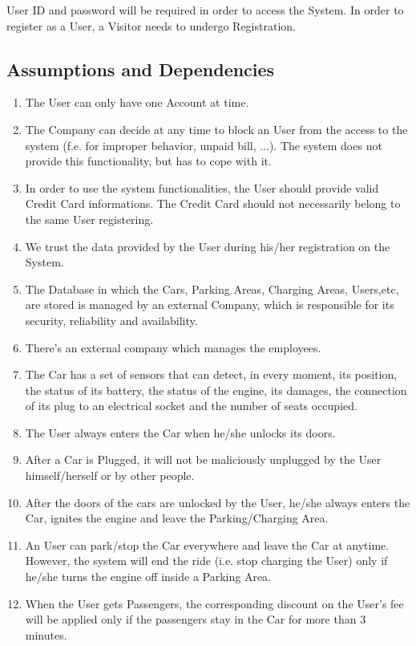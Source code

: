 User ID and password will be required in order to access the System. In order to register as a User, a Visitor needs to undergo Registration. 

\subsection{Assumptions and Dependencies}
\begin{enumerate}
	\item The User can only have one Account at time.
	\item The Company can decide at any time to block an User from the access to the system (f.e. for improper behavior, unpaid bill, ...). The system does not provide this functionality, but has to cope with it.
	\item In order to use the system functionalities, the User should provide valid Credit Card informations. The Credit Card should not necessarily belong to the same User registering.
	\item We trust the data provided by the User during his/her registration on the System.
	\item The Database in which the Cars, Parking Areas, Charging Areas, Users,etc, are stored is managed by an external Company, which is responsible for its security, reliability and availability.
	\item There's an external company which manages the employees.
	\item The Car has a set of sensors that can detect, in every moment, its position, the status of its battery, the status of the engine, its damages, the connection of its plug to an electrical socket and the number of seats occupied.
	\item The User always enters the Car when he/she unlocks its doors.	
	\item After a Car is Plugged, it will not be maliciously unplugged by the User himself/herself or by other people.
	\item After the doors of the cars are unlocked by the User, he/she always enters the Car, ignites the engine and leave the Parking/Charging Area.
	\item An User can park/stop the Car everywhere and leave the Car at anytime. However, the system will end the ride (i.e. stop charging the User) only if he/she turns the engine off inside a Parking Area.
	\item When the User gets Passengers, the corresponding discount on the User's fee will be applied only if the passengers stay in the Car for more than 3 minutes.	

\end{enumerate}
